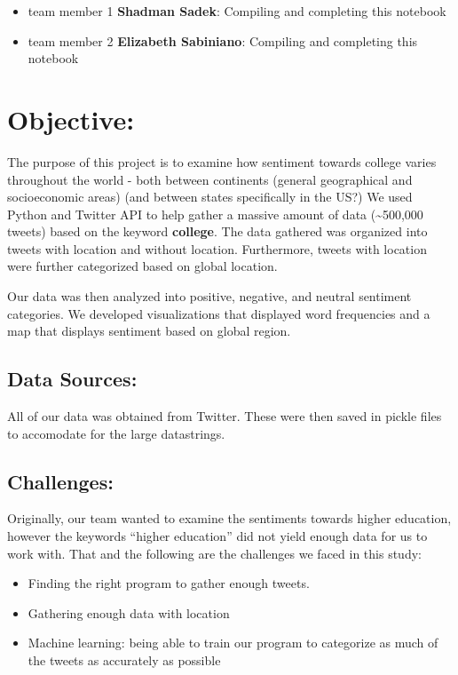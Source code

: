 \documentclass{article}
\begin{document}
\begin{itemize}
\itemsep1pt\parskip0pt
\item
  team member 1 \textbf{Shadman Sadek}: Compiling and completing this
  notebook
\item
  team member 2 \textbf{Elizabeth Sabiniano}: Compiling and completing
  this notebook
\end{itemize}


    \section{Objective:}


    The purpose of this project is to examine how sentiment towards college
varies throughout the world - both between continents (general
geographical and socioeconomic areas) (and between states specifically
in the US?) We used Python and Twitter API to help gather a massive
amount of data (\textasciitilde{}500,000 tweets) based on the keyword
\textbf{college}. The data gathered was organized into tweets with
location and without location. Furthermore, tweets with location were
further categorized based on global location.

Our data was then analyzed into positive, negative, and neutral
sentiment categories. We developed visualizations that displayed word
frequencies and a map that displays sentiment based on global region.


    \subsection{Data Sources:}


    All of our data was obtained from Twitter. These were then saved in
pickle files to accomodate for the large datastrings.


    \subsection{Challenges:}


    Originally, our team wanted to examine the sentiments towards higher
education, however the keywords ``higher education'' did not yield
enough data for us to work with. That and the following are the
challenges we faced in this study:

\begin{itemize}
\itemsep1pt\parskip0pt
\item
  Finding the right program to gather enough tweets.
\item
  Gathering enough data with location
\item
  Machine learning: being able to train our program to categorize as
  much of the tweets as accurately as possible
\end{itemize}
\end{document}
